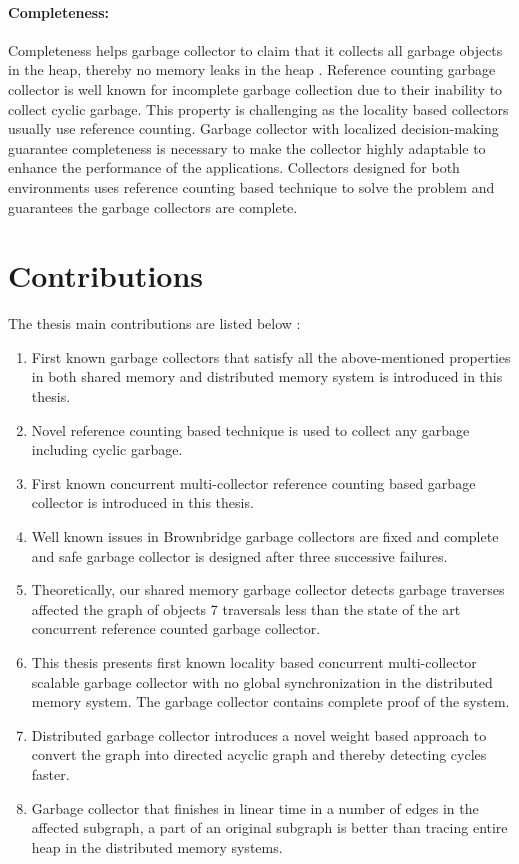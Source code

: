 \paragraph{Completeness:}
Completeness helps garbage collector to claim that it collects all garbage objects in the heap, thereby no memory leaks in the heap . Reference counting garbage collector is well known for incomplete garbage collection due to their inability to collect cyclic garbage. This property is challenging as the locality based collectors usually use reference counting. Garbage collector with localized decision-making guarantee completeness is necessary to make the collector highly adaptable to enhance the performance of the applications. Collectors designed for both environments uses reference counting based technique to solve the problem and guarantees the garbage collectors are complete.
\section{Contributions}
\label{intro:contr}
The thesis main contributions are listed below :
\begin{enumerate}
	\item First known garbage collectors that satisfy all the above-mentioned properties in both shared memory and distributed memory system is introduced in this thesis.
	\item Novel reference counting based technique is used to collect any garbage including cyclic garbage.    
	\item First known concurrent multi-collector reference counting based garbage collector is introduced in this thesis.
	\item Well known issues in Brownbridge garbage collectors are fixed and complete and safe garbage collector is designed after three successive failures.
	\item Theoretically, our shared memory garbage collector detects garbage traverses affected the graph of objects 7 traversals less than the state of the art concurrent reference counted garbage collector.
	\item This thesis presents first known locality based concurrent multi-collector scalable garbage collector with no global synchronization in the distributed memory system. The garbage collector contains complete proof of the system.
	\item Distributed garbage collector introduces a novel weight based approach to convert the graph into directed acyclic graph and thereby detecting cycles faster.
	\item Garbage collector that finishes in linear time in a number of edges in the affected subgraph, a part of an original subgraph is better than tracing entire heap in the distributed memory systems.
\end{enumerate}
